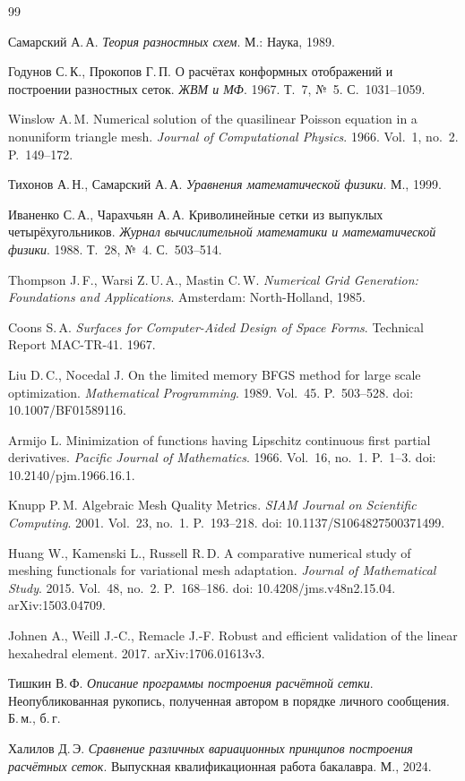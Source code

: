 \documentclass[11pt,a4paper]{article}
\begin{document}
\begingroup
\footnotesize
\raggedright
\begin{thebibliography}{99}
\setlength{\itemsep}{0.1em}
\setlength{\parsep}{0pt}

Самарский А.\,А.
\textit{Теория разностных схем}.
М.: Наука, 1989.

Годунов С.\,К., Прокопов Г.\,П.
О расчётах конформных отображений и построении разностных сеток.
\textit{ЖВМ и МФ}. 1967. Т.~7, №~5. С.~1031--1059.

Winslow A.\,M.
Numerical solution of the quasilinear Poisson equation in a nonuniform
triangle mesh.
\textit{Journal of Computational Physics}. 1966. Vol.~1, no.~2.
P.~149--172.

Тихонов А.\,Н., Самарский А.\,А.
\textit{Уравнения математической физики}.
М., 1999.

Иваненко С.\,А., Чарахчьян А.\,А.
Криволинейные сетки из выпуклых четырёхугольников.
\textit{Журнал вычислительной математики и математической физики}.
1988. Т.~28, №~4. С.~503--514.

Thompson J.\,F., Warsi Z.\,U.\,A., Mastin C.\,W.
\textit{Numerical Grid Generation: Foundations and Applications}.
Amsterdam: North-Holland, 1985.

Coons S.\,A.
\textit{Surfaces for Computer-Aided Design of Space Forms}.
Technical Report MAC-TR-41. 1967.

Liu D.\,C., Nocedal J.
On the limited memory BFGS method for large scale optimization.
\textit{Mathematical Programming}. 1989. Vol.~45. P.~503--528.
doi: 10.1007/BF01589116.

Armijo L.
Minimization of functions having Lipschitz continuous first partial
derivatives.
\textit{Pacific Journal of Mathematics}. 1966. Vol.~16, no.~1.
P.~1--3. doi: 10.2140/pjm.1966.16.1.

Knupp P.\,M. Algebraic Mesh Quality Metrics.
\textit{SIAM Journal on Scientific Computing}. 2001. Vol.~23, no.~1.
P.~193--218. doi: 10.1137/S1064827500371499.

Huang W., Kamenski L., Russell R.\,D.
A comparative numerical study of meshing functionals for variational mesh adaptation.
\textit{Journal of Mathematical Study}. 2015. Vol.~48, no.~2. P.~168--186.
doi: 10.4208/jms.v48n2.15.04. arXiv:1503.04709.

Johnen A., Weill J.-C., Remacle J.-F.
Robust and efficient validation of the linear hexahedral element.
2017. arXiv:1706.01613v3.

Тишкин В.\,Ф.
\textit{Описание программы построения расчётной сетки}.
Неопубликованная рукопись, полученная автором в порядке личного
сообщения. Б.\,м., б.\,г.

Халилов Д.\,Э.
\textit{Сравнение различных вариационных принципов построения расчётных
сеток}.
Выпускная квалификационная работа бакалавра. М., 2024.

\end{thebibliography}
\endgroup
\end{document}
